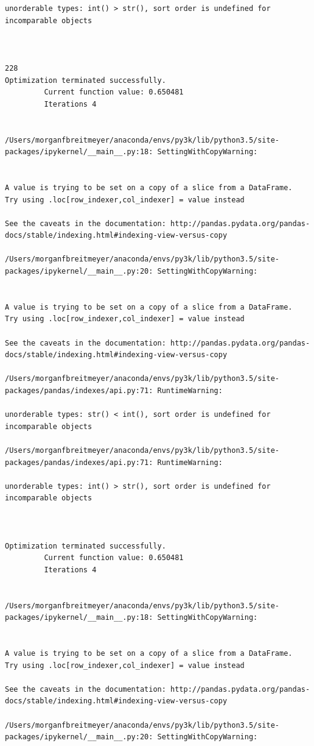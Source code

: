 \begin{lstlisting}
unorderable types: int() > str(), sort order is undefined for incomparable objects



228
Optimization terminated successfully.
         Current function value: 0.650481
         Iterations 4


/Users/morganfbreitmeyer/anaconda/envs/py3k/lib/python3.5/site-packages/ipykernel/__main__.py:18: SettingWithCopyWarning:


A value is trying to be set on a copy of a slice from a DataFrame.
Try using .loc[row_indexer,col_indexer] = value instead

See the caveats in the documentation: http://pandas.pydata.org/pandas-docs/stable/indexing.html#indexing-view-versus-copy

/Users/morganfbreitmeyer/anaconda/envs/py3k/lib/python3.5/site-packages/ipykernel/__main__.py:20: SettingWithCopyWarning:


A value is trying to be set on a copy of a slice from a DataFrame.
Try using .loc[row_indexer,col_indexer] = value instead

See the caveats in the documentation: http://pandas.pydata.org/pandas-docs/stable/indexing.html#indexing-view-versus-copy

/Users/morganfbreitmeyer/anaconda/envs/py3k/lib/python3.5/site-packages/pandas/indexes/api.py:71: RuntimeWarning:

unorderable types: str() < int(), sort order is undefined for incomparable objects

/Users/morganfbreitmeyer/anaconda/envs/py3k/lib/python3.5/site-packages/pandas/indexes/api.py:71: RuntimeWarning:

unorderable types: int() > str(), sort order is undefined for incomparable objects



Optimization terminated successfully.
         Current function value: 0.650481
         Iterations 4


/Users/morganfbreitmeyer/anaconda/envs/py3k/lib/python3.5/site-packages/ipykernel/__main__.py:18: SettingWithCopyWarning:


A value is trying to be set on a copy of a slice from a DataFrame.
Try using .loc[row_indexer,col_indexer] = value instead

See the caveats in the documentation: http://pandas.pydata.org/pandas-docs/stable/indexing.html#indexing-view-versus-copy

/Users/morganfbreitmeyer/anaconda/envs/py3k/lib/python3.5/site-packages/ipykernel/__main__.py:20: SettingWithCopyWarning:



\end{lstlisting}
